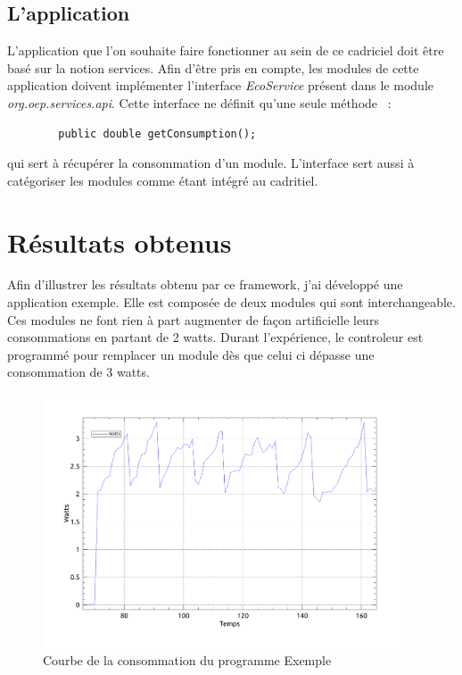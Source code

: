 \documentclass[a4paper, 11pt]{report}
\begin{document}
		\subsection{L'application}
L'application que l'on souhaite faire fonctionner au sein de ce cadriciel doit être basé sur la notion services. Afin d'être pris en compte, les modules de cette application doivent implémenter l'interface \textit{EcoService} présent dans le module \textit{org.oep.services.api}. Cette interface ne définit qu'une seule méthode ~:
\begin{verbatim}
        public double getConsumption();
\end{verbatim}
 qui sert à récupérer la consommation d'un module. L'interface sert aussi à catégoriser les modules comme étant intégré au cadritiel.
 
	\section{Résultats obtenus}
Afin d'illustrer les résultats obtenu par ce framework, j'ai développé une application exemple. Elle est composée de deux modules qui sont interchangeable. Ces modules ne font rien à part augmenter de façon artificielle leurs consommations en partant de 2 watts. Durant l'expérience, le controleur est programmé pour remplacer un module dès que celui ci dépasse une consommation de 3 watts. 

\begin{figure}
	\centering
	\includegraphics[width=0.95\textwidth]{figures/EcoPattern_Courbe_Exemple.pdf}
	\caption{Courbe de la consommation du programme Exemple}
	\label{CourbeExp}
\end{figure}
\end{document}
